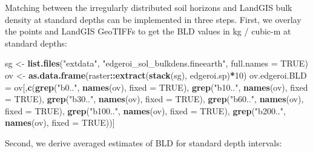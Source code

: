 \documentclass[graybox,natbib,nospthms,UStrade]{svmono}
\newenvironment{Shaded}{\begin{snugshade}}{\end{snugshade}}
\newcommand{\DataTypeTok}[1]{\textcolor[rgb]{0.27,0.27,0.27}{#1}}
\newcommand{\DecValTok}[1]{\textcolor[rgb]{0.06,0.06,0.06}{#1}}
\newcommand{\KeywordTok}[1]{\textcolor[rgb]{0.27,0.27,0.27}{\textbf{#1}}}
\newcommand{\NormalTok}[1]{#1}
\newcommand{\OperatorTok}[1]{\textcolor[rgb]{0.43,0.43,0.43}{\textbf{#1}}}
\newcommand{\OtherTok}[1]{\textcolor[rgb]{0.37,0.37,0.37}{#1}}
\newcommand{\StringTok}[1]{\textcolor[rgb]{0.5,0.5,0.5}{#1}}
\begin{document}
Matching between the irregularly distributed soil horizons and LandGIS bulk density at standard depths can be implemented in three steps. First, we overlay the points and LandGIS GeoTIFFs to get the BLD values in kg / cubic-m at standard depths:

\begin{Shaded}
\begin{Highlighting}[]
\NormalTok{sg <-}\StringTok{ }\KeywordTok{list.files}\NormalTok{(}\StringTok{"extdata"}\NormalTok{, }\StringTok{"edgeroi_sol_bulkdens.fineearth"}\NormalTok{, }\DataTypeTok{full.names =} \OtherTok{TRUE}\NormalTok{)}
\NormalTok{ov <-}\StringTok{ }\KeywordTok{as.data.frame}\NormalTok{(raster}\OperatorTok{::}\KeywordTok{extract}\NormalTok{(}\KeywordTok{stack}\NormalTok{(sg), edgeroi.sp)}\OperatorTok{*}\DecValTok{10}\NormalTok{)}
\NormalTok{ov.edgeroi.BLD =}\StringTok{ }\NormalTok{ov[,}\KeywordTok{c}\NormalTok{(}\KeywordTok{grep}\NormalTok{(}\StringTok{"b0.."}\NormalTok{, }\KeywordTok{names}\NormalTok{(ov), }\DataTypeTok{fixed =} \OtherTok{TRUE}\NormalTok{), }\KeywordTok{grep}\NormalTok{(}\StringTok{"b10.."}\NormalTok{, }\KeywordTok{names}\NormalTok{(ov), }\DataTypeTok{fixed =} \OtherTok{TRUE}\NormalTok{), }
                       \KeywordTok{grep}\NormalTok{(}\StringTok{"b30.."}\NormalTok{, }\KeywordTok{names}\NormalTok{(ov), }\DataTypeTok{fixed =} \OtherTok{TRUE}\NormalTok{), }\KeywordTok{grep}\NormalTok{(}\StringTok{"b60.."}\NormalTok{, }\KeywordTok{names}\NormalTok{(ov), }\DataTypeTok{fixed =} \OtherTok{TRUE}\NormalTok{), }
                       \KeywordTok{grep}\NormalTok{(}\StringTok{"b100.."}\NormalTok{, }\KeywordTok{names}\NormalTok{(ov), }\DataTypeTok{fixed =} \OtherTok{TRUE}\NormalTok{), }\KeywordTok{grep}\NormalTok{(}\StringTok{"b200.."}\NormalTok{, }\KeywordTok{names}\NormalTok{(ov), }\DataTypeTok{fixed =} \OtherTok{TRUE}\NormalTok{))]}
\end{Highlighting}
\end{Shaded}

Second, we derive averaged estimates of BLD for standard depth intervals:
\end{document}
